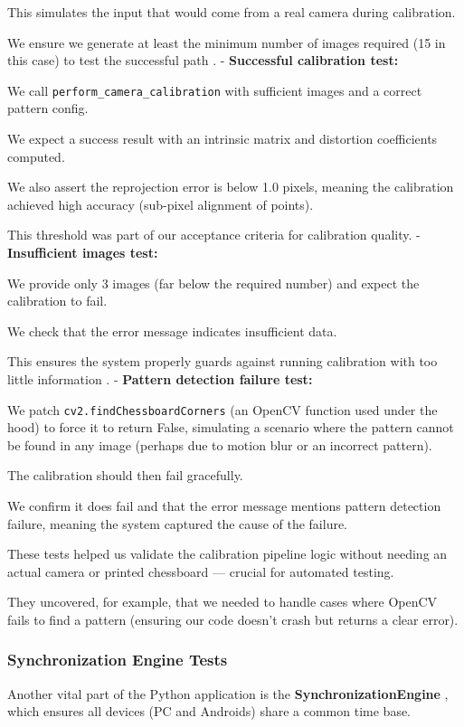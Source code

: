 {{This simulates the input that would come from a real camera during calibration.

We ensure we generate at least the minimum number of images required (15 in this case) to test the successful path
. - \textbf{Successful calibration test:}

We call \texttt{perform\_camera\_calibration} with sufficient images and a
correct pattern config.

We expect a success result with an intrinsic matrix and distortion coefficients
computed.

We also assert the reprojection error is below 1.0 pixels, meaning the
calibration achieved high accuracy (sub-pixel alignment of points).

This threshold was part of our acceptance criteria for calibration quality.
- \textbf{Insufficient images test:}

We provide only 3 images (far below the required number) and expect the
calibration to fail.

We check that the error message indicates insufficient data.

This ensures the system properly guards against running calibration with too little information
. - \textbf{Pattern detection failure test:}

We patch \texttt{cv2.findChessboardCorners} (an OpenCV function used under the
hood) to force it to return False, simulating a scenario where the pattern
cannot be found in any image (perhaps due to motion blur or an incorrect
pattern).

The calibration should then fail gracefully.

We confirm it does fail and that the error message mentions pattern detection
failure, meaning the system captured the cause of the failure.

These tests helped us validate the calibration pipeline logic without needing an
actual camera or printed chessboard --- crucial for automated testing.

They uncovered, for example, that we needed to handle cases where OpenCV fails
to find a pattern (ensuring our code doesn't crash but returns a clear error).

\subsubsection{Synchronization Engine Tests}

Another vital part of the Python application is the \textbf{SynchronizationEngine}
, which ensures all devices (PC and Androids) share a common time base.

}}
